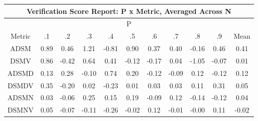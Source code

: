 \documentclass[11pt,a4paper]{report}
\begin{document}
\begin{longtable}{ | c || c | c | c | c | c | c | c | c | c || c |}
\hline
\multicolumn{11}{|c|}{ Verification Score Report: P x Metric, Averaged Across N } \\
\hline
\multicolumn{11}{|c|}{ P } \\
\hline
Metric & .1 & .2 & .3 & .4 & .5 & .6 & .7 & .8 & .9 & Mean\\
\hline
\hline
\endhead
ADSM &  \cellcolor[HTML]{E7E7FF} 0.89 &  \cellcolor[HTML]{F7F7FF} 0.46 &  \cellcolor[HTML]{DFDFFF} 1.21 &  \cellcolor[HTML]{FFE7E7} -0.81 &  \cellcolor[HTML]{E7E7FF} 0.90 &  \cellcolor[HTML]{F7F7FF} 0.37 &  \cellcolor[HTML]{F7F7FF} 0.40 &  \cellcolor[HTML]{FFF7F7} -0.16 &  \cellcolor[HTML]{F7F7FF} 0.46 &  \cellcolor[HTML]{F7F7FF} 0.41 \\
DSMV &  \cellcolor[HTML]{E7E7FF} 0.86 &  \cellcolor[HTML]{FFF7F7} -0.42 &  \cellcolor[HTML]{EFEFFF} 0.64 &  \cellcolor[HTML]{F7F7FF} 0.41 &  \cellcolor[HTML]{FFFFFF} -0.12 &  \cellcolor[HTML]{FFF7F7} -0.17 &  \cellcolor[HTML]{FFFFFF} 0.04 &  \cellcolor[HTML]{FFE7E7} -1.05 &  \cellcolor[HTML]{FFFFFF} -0.07 &  \cellcolor[HTML]{FFFFFF} 0.01 \\
ADSMD &  \cellcolor[HTML]{FFFFFF} 0.13 &  \cellcolor[HTML]{F7F7FF} 0.28 &  \cellcolor[HTML]{FFFFFF} -0.10 &  \cellcolor[HTML]{EFEFFF} 0.74 &  \cellcolor[HTML]{F7F7FF} 0.20 &  \cellcolor[HTML]{FFFFFF} -0.12 &  \cellcolor[HTML]{FFFFFF} -0.09 &  \cellcolor[HTML]{FFFFFF} 0.12 &  \cellcolor[HTML]{FFFFFF} -0.12 &  \cellcolor[HTML]{FFFFFF} 0.12 \\
DSMDV &  \cellcolor[HTML]{F7F7FF} 0.35 &  \cellcolor[HTML]{FFF7F7} -0.20 &  \cellcolor[HTML]{FFFFFF} 0.02 &  \cellcolor[HTML]{FFF7F7} -0.23 &  \cellcolor[HTML]{FFFFFF} 0.01 &  \cellcolor[HTML]{FFFFFF} 0.03 &  \cellcolor[HTML]{FFFFFF} 0.03 &  \cellcolor[HTML]{FFFFFF} 0.11 &  \cellcolor[HTML]{F7F7FF} 0.31 &  \cellcolor[HTML]{FFFFFF} 0.05 \\
ADSMN &  \cellcolor[HTML]{FFFFFF} 0.03 &  \cellcolor[HTML]{FFFFFF} -0.06 &  \cellcolor[HTML]{F7F7FF} 0.25 &  \cellcolor[HTML]{FFFFFF} 0.15 &  \cellcolor[HTML]{F7F7FF} 0.19 &  \cellcolor[HTML]{FFFFFF} -0.09 &  \cellcolor[HTML]{FFFFFF} 0.12 &  \cellcolor[HTML]{FFFFFF} -0.14 &  \cellcolor[HTML]{FFFFFF} -0.12 &  \cellcolor[HTML]{FFFFFF} 0.04 \\
DSMNV &  \cellcolor[HTML]{FFFFFF} 0.05 &  \cellcolor[HTML]{FFFFFF} -0.07 &  \cellcolor[HTML]{FFFFFF} -0.11 &  \cellcolor[HTML]{FFF7F7} -0.26 &  \cellcolor[HTML]{FFFFFF} -0.02 &  \cellcolor[HTML]{FFFFFF} 0.12 &  \cellcolor[HTML]{FFFFFF} -0.01 &  \cellcolor[HTML]{FFFFFF} -0.00 &  \cellcolor[HTML]{FFFFFF} 0.11 &  \cellcolor[HTML]{FFFFFF} -0.02 \\

\end{longtable}
\end{document}
